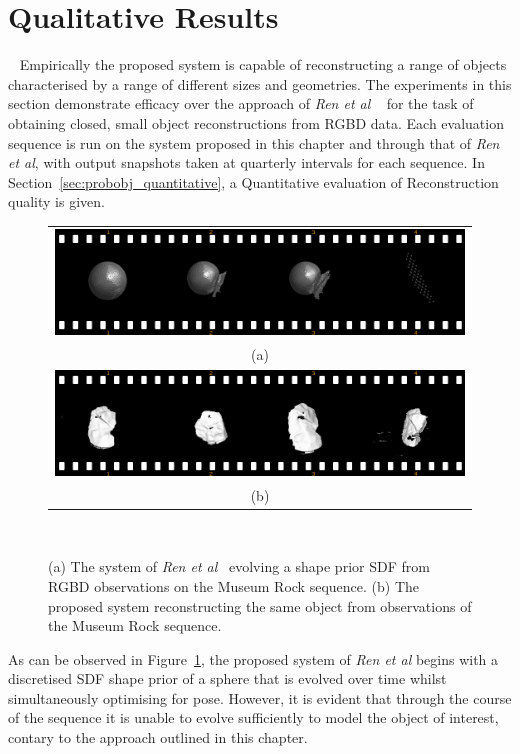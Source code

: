 \section{Qualitative Results}
~\label{sec:probobj_qualitative}
Empirically the proposed system is capable of reconstructing a range of objects 
characterised by a range of different sizes and geometries. The experiments in 
this section demonstrate efficacy over the approach of \textit{Ren et al} 
~\cite{Ren2013} for the task of obtaining closed, small object reconstructions 
from RGBD data. Each evaluation sequence is run on the system proposed in this 
chapter and through that of \textit{Ren et al}, with output snapshots taken at 
quarterly intervals for each sequence. In Section~\ref{sec:probobj_quantitative}, 
a Quantitative evaluation of Reconstruction quality is given.

\begin{figure}[!htbp]
  \centering
  \begin{tabular}{@{}c@{}}
    \includegraphics[width=.6\linewidth]{figures/object_recon/strips/rock_s3d.png} \\
    (a) \\
    \includegraphics[width=.6\linewidth]{figures/object_recon/strips/rock.png} \\ 
    (b)\\
  \end{tabular}
  \caption[Probabilistic Object Reconstruction Qualitative Results I]
  {(a) The system of \textit{Ren et al}~\cite{Ren2013} evolving a shape prior SDF 
  from RGBD observations on the Museum Rock sequence. (b) The proposed system reconstructing 
  the same object from observations of the Museum Rock sequence.}
~\label{figure:probobj_rock_s3d}
\end{figure}

As can be observed in Figure~\ref{figure:probobj_rock_s3d}, the proposed system of 
\textit{Ren et al} begins with a discretised SDF shape prior of a sphere that is 
evolved over time whilst simultaneously optimising for pose. However, it is evident 
that through the course of the sequence it is unable to evolve sufficiently to model 
the object of interest, contary to the approach outlined in this chapter.

